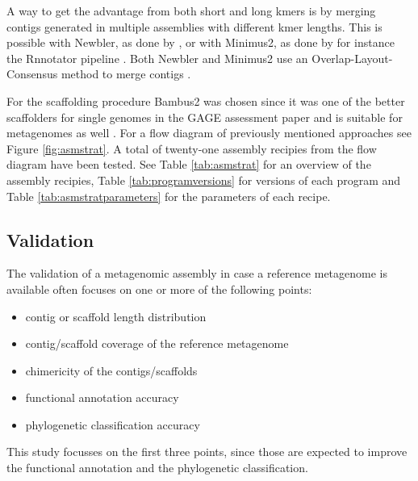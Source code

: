 A way to get the advantage from both short and long kmers is by merging contigs
generated in multiple assemblies with different kmer lengths. This is possible
with Newbler, as done by \cite{Luo22347999}, or with Minimus2, as done by for
instance the Rnnotator pipeline \cite{Martin21106091}. Both Newbler and
Minimus2 use an Overlap-Layout-Consensus method to merge contigs
\cite{Sommer17324286,Miller20211242}.


For the scaffolding procedure Bambus2 was chosen since it was one of the better
scaffolders for single genomes in the GAGE assessment paper
\cite{Salzberg22147368} and is suitable for metagenomes as well
\cite{Koren21926123}. For a flow diagram of previously mentioned approaches see
Figure \ref{fig:asmstrat}. A total of twenty-one assembly recipies from the flow
diagram have been tested. See Table \ref{tab:asmstrat} for an overview of the
assembly recipies, Table \ref{tab:programversions} for versions of each
program and Table \ref{tab:asmstratparameters} for the parameters of each
recipe.



\subsection*{Validation} \label{sec:metval} The validation of a metagenomic assembly in
case a reference metagenome is available often focuses on one or more of the
following points:
\begin{itemize}
\item contig or scaffold length distribution
\item contig/scaffold coverage of the reference metagenome
\item chimericity of the contigs/scaffolds
\item functional annotation accuracy
\item phylogenetic classification accuracy
\end{itemize}
This study focusses on the first three points, since those are expected to
improve the functional annotation and the phylogenetic classification.

